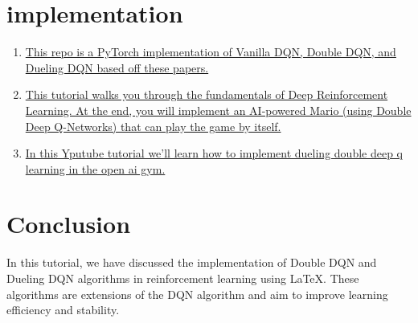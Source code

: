 \documentclass{article}
\begin{document}
\section{implementation}
\begin{enumerate}
\item \href{https://github.com/dxyang/DQN_pytorch}{This repo is a PyTorch implementation of Vanilla DQN, Double DQN, and Dueling DQN based off these papers.}
\item \href{https://pytorch.org/tutorials/intermediate/mario_rl_tutorial.html}{This tutorial walks you through the fundamentals of Deep Reinforcement Learning. At the end, you will implement an AI-powered Mario (using Double Deep Q-Networks) that can play the game by itself.}
\item \href{https://youtu.be/H9uCYnG3LlE?si=68NrQsa_Xz1wyTF4}{In this Yputube tutorial we'll learn how to implement dueling double deep q learning in the open ai gym.}
\end{enumerate}





\section{Conclusion}
In this tutorial, we have discussed the implementation of Double DQN and Dueling DQN algorithms in reinforcement learning using LaTeX. These algorithms are extensions of the DQN algorithm and aim to improve learning efficiency and stability.
\end{document}
